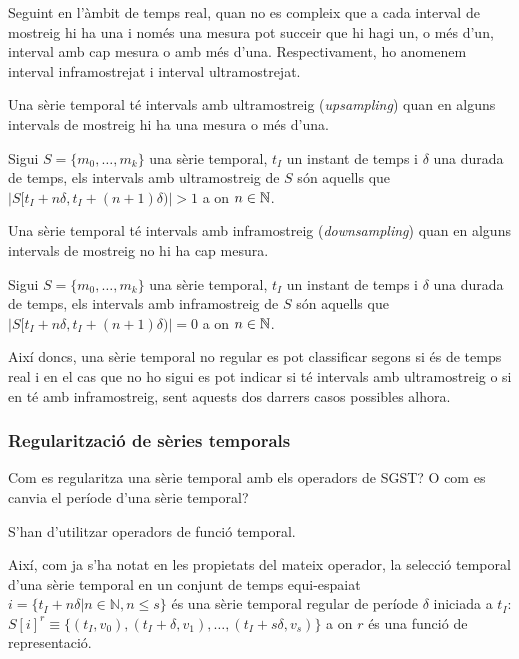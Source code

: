 Seguint en l'àmbit de temps real, quan no es compleix que a cada
interval de mostreig hi ha una i només una mesura pot succeir que hi
hagi un, o més d'un, interval amb cap mesura o amb més
d'una. Respectivament, ho anomenem interval inframostrejat i interval
ultramostrejat. 



Una sèrie temporal té intervals amb ultramostreig (\emph{upsampling})
quan en alguns intervals de mostreig hi ha una mesura o més d'una.
\begin{definition}
  Sigui $S=\{m_0,\dotsc,m_k\}$ una sèrie temporal, $t_I$ un instant de
  temps i $\delta$ una durada de temps, els intervals amb
  ultramostreig de $S$ són aquells que
  $|S[t_I+n\delta,t_I+(n+1)\delta)|>1$ a on $n\in\mathbb{N}$.
\end{definition}

Una sèrie temporal té intervals amb inframostreig
(\emph{downsampling}) quan en alguns intervals de mostreig no hi ha
cap mesura.
\begin{definition}
  Sigui $S=\{m_0,\dotsc,m_k\}$ una sèrie temporal, $t_I$ un instant de
  temps i $\delta$ una durada de temps, els intervals amb
  inframostreig de $S$ són aquells que
  $|S[t_I+n\delta,t_I+(n+1)\delta)|=0$ a on $n\in\mathbb{N}$.
\end{definition}

Així doncs, una sèrie temporal no regular es pot classificar segons si
és de temps real i en el cas que no ho sigui es pot indicar si té
intervals amb ultramostreig o si en té amb inframostreig, sent aquests
dos darrers casos possibles alhora.





\subsubsection{Regularització de sèries temporals}

\todo{}

Com es regularitza una sèrie temporal amb els operadors de SGST? O com es canvia el període d'una sèrie temporal?

S'han d'utilitzar operadors de funció temporal. 

Així, com ja s'ha notat en les propietats del mateix operador, la
selecció temporal d'una sèrie temporal en un conjunt de temps
equi-espaiat $i = \{t_I+n\delta | n\in\mathbb{N}, n\leq s \}$ és una
sèrie temporal regular de període $\delta$ iniciada a $t_I$: $S[i]^r
\equiv \{ (t_I, v_0), (t_I+\delta,v_1), \dotsc , (t_I+s\delta,v_s)\}$
a on $r$ és una funció de representació.


